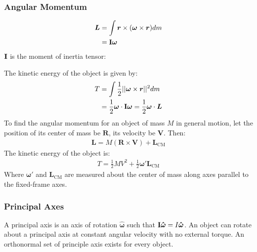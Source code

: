\documentclass[11pt]{article}
\newcommand{\ve}[1]{
  \ensuremath{\bm{#1}}}	               %
\newcommand{\uve}[1]{
  \ensuremath{\bm{\hat{#1}}}}          %
\newcommand{\tensor}[1]{
  \ensuremath{\text{\bf{#1}}}}         %
\begin{document}
\begin{multicols*}{3}
\subsubsection{Angular Momentum}
\begin{align*}
\ve{L} &= \int \ve{r} \times (\ve{\omega} \times \ve{r}) dm \\
&= \tensor{I} \ve{\omega}
\end{align*}
$\tensor{I}$ is the moment of inertia tensor:
\vspace*{-0.7em}
\begin{center}
\end{center}
The kinetic energy of the object is given by:
\begin{align*}
T &= \int\frac{1}{2} ||\ve{\omega} \times \ve{r}||^2 dm \\
&= \frac{1}{2} \ve{\omega} \cdot \tensor{I}\ve{\omega} = \frac{1}{2} \ve{\omega} \cdot \ve{L}
\end{align*}
To find the angular momentum for an object of mass $M$ in general motion, let the position of its center of mass be $\ve{R}$, its velocity be $\ve{V}$. Then:
\begin{align*}
\ve{L} = M(\ve{R} \times \ve{V}) + \ve{L}_{\text{CM}}
\end{align*}
The kinetic energy of the object is:
\begin{align*}
T = \frac{1}{2}MV^2 + \frac{1}{2}\ve{\omega}' \ve{L}_{\text{CM}}
\end{align*}
Where $\ve{\omega}'$ and $\ve{L}_{\text{CM}}$ are measured about the center of mass along axes parallel to the fixed-frame axes.

\subsubsection{Principal Axes}
A principal axis is an axis of rotation $\uve{\omega}$ such that $\tensor{I}\uve{\omega} = I\uve{\omega}$. An object can rotate about a principal axis at constant angular velocity with no external torque. An orthonormal set of principle axis exists for every object.


\end{multicols*}
\end{document}
